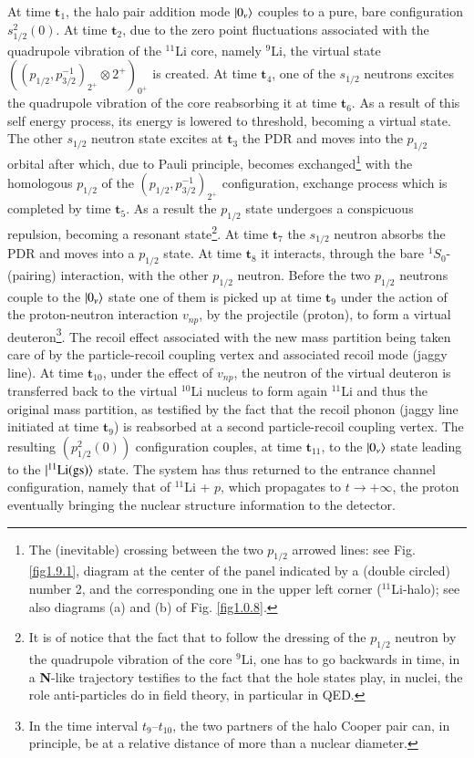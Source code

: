  At time $\mathbf{t}_1$, the halo pair addition mode $|{0_\nu} \rangle$ couples to a pure, bare configuration $s_{1/2}^2(0)$. At time $\mathbf{t}_2$,  due to the zero point fluctuations associated with the quadrupole vibration of the $^{11}$Li core, namely $^9$Li, the virtual state $((p_{1/2},p_{3/2}^{-1})_{2^+}\otimes 2^+)_{0^+}$ is created. At time $\mathbf{t}_4$, one of the  $s_{1/2}$ neutrons excites the quadrupole vibration of the core reabsorbing it at time $\mathbf{t}_6$. As a result of this self energy process, its energy is lowered to threshold, becoming a virtual state. The other $s_{1/2}$  neutron state excites at $\mathbf{t}_3$ the PDR and moves into the $p_{1/2}$ orbital after which,  due to Pauli principle, becomes exchanged\footnote{The (inevitable) crossing between the two $p_{1/2}$ arrowed lines: see Fig. \ref{fig1.9.1},  diagram at the center of the panel indicated by a (double circled) number 2, and the corresponding one in the upper left corner ($^{11}$Li-halo); see also diagrams (a) and (b) of Fig. \ref{fig1.0.8}.} with the homologous $p_{1/2}$ of the $(p_{1/2},p_{3/2}^{-1})_{2^+}$
configuration, exchange process which is completed by time $\mathbf{t}_5$. As a result the $p_{1/2}$ state undergoes a conspicuous repulsion, becoming a resonant state\footnote{It is of notice that the fact that to follow the dressing of the $p_{1/2}$ neutron by the quadrupole vibration of the core $^9$Li, one has to go backwards in time, in a \textbf{N}-like trajectory testifies to the fact that the hole states play, in nuclei, the role  anti-particles do in field theory, in particular in QED. }. At time $\mathbf{t}_7$ the $s_{1/2}$ neutron absorbs the PDR and moves into a $p_{1/2}$ state. At time $\mathbf{t}_8$ it interacts, through the bare $^1S_0$-(pairing) interaction, with the other $p_{1/2}$ neutron. Before the two $p_{1/2}$ neutrons couple to the $|{0_\nu} \rangle$ state one of them is picked up at time $\mathbf{t}_9$ under the action of the proton-neutron interaction $v_{np}$, by the projectile (proton), to form a virtual deuteron\footnote{In the time interval $t_9$--$t_{10}$, the two partners of the halo Cooper pair can, in principle, be at a relative distance of more than a nuclear diameter.}. The recoil effect associated with the new mass partition being taken care of by the particle-recoil coupling vertex and associated recoil mode (jaggy line). At time $\mathbf{t}_{10}$,  under the effect of $v_{np}$, the neutron of the virtual deuteron is transferred back to the virtual $^{10}$Li nucleus to form again $^{11}$Li and thus the original mass partition, as testified by the fact that the recoil phonon (jaggy line initiated at time $\mathbf{t}_9$) is reabsorbed at a second particle-recoil coupling vertex. The resulting $(p^2_{1/2}(0))$ configuration couples, at time $\mathbf{t}_{11}$, to the $|{0_\nu} \rangle$ state leading to the $|{^{11}\text{Li(gs)}} \rangle$ state. The system has thus returned to the entrance channel configuration, namely that of $^{11}$Li + $p$, which propagates to $t\to+\infty$, the proton eventually bringing the nuclear structure information to the detector.


